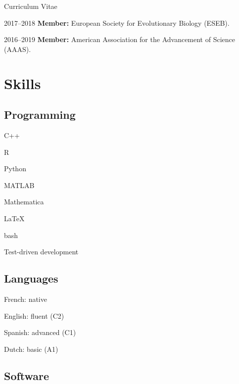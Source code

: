 \documentclass[11pt,a4paper]{article}
\begin{document}
\begin{cv}{Curriculum Vitae}
\begin{cvlist}{}
			\item[2017--2018] \textbf{Member:} European Society for Evolutionary Biology (ESEB).
			
			\item[2016--2019] \textbf{Member:} American Association for the Advancement of Science (AAAS).
			
		\end{cvlist}
		
		\section{Skills}
		
		\subsection{Programming}
		
		\begin{cvlist}{}
		
			\item C++
			\item R
			\item Python
			\item MATLAB
			\item Mathematica
			\item LaTeX
			\item bash
			\item Test-driven development
		
		\end{cvlist}
	
		\subsection{Languages}
		
		\begin{cvlist}{}
			
			\item French: native
			\item English: fluent (C2)
			\item Spanish: advanced (C1)
			\item Dutch: basic (A1)
			
		\end{cvlist}
	
		\subsection{Software}
		
		\begin{cvlist}{}
			

\end{cvlist}
\end{cv}
\end{document}
